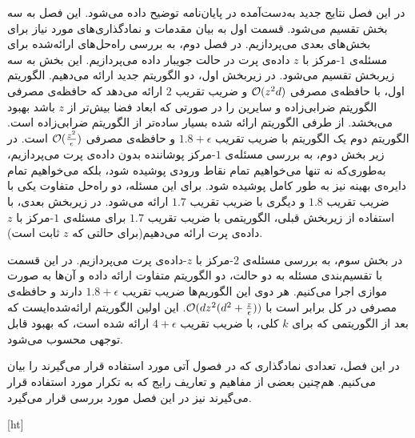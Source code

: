 

در این فصل نتایج جدید به‌دست‌آمده در پایان‌نامه توضیح داده می‌شود. این فصل به سه بخش تقسیم می‌شود. قسمت اول به بیان مقدمات و نمادگذاری‌های مورد نیاز برای بخش‌های بعدی می‌پردازیم. در فصل دوم، به بررسی راه‌حل‌های ارائه‌شده برای مسئله‌ی $1$-مرکز با $z$ داده‌ی پرت در حالت جویبار داده می‌پردازیم. این بخش به سه زیربخش تقسیم می‌شود. در زیربخش اول، دو الگوریتم جدید ارائه می‌دهیم. الگوریتم اول، با حافظه‌ی مصرفی $\mathcal{O}(z^2d)$ و ضریب تقریب $2$ ارائه می‌دهد که حافظه‌ی مصرفی الگوریتم ضرابی‌زاده و سایرین  را در صورتی که ابعاد فضا بیش‌تر از $z$ باشد بهبود می‌بخشد. از طرفی الگوریتم ارائه شده بسیار ساده‌تر از الگوریتم ضرابی‌زاده است. الگوریتم دوم یک الگوریتم با ضریب تقریب $1.8 + \epsilon$ و حافظه‌ی مصرفی $\mathcal{O}(\frac{z^2}{\epsilon})$ است. در زیر بخش دوم، به بررسی مسئله‌ی $1$-مرکز پوشاننده بدون داده‌ی پرت می‌پردازیم، به‌طوری‌که نه تنها می‌خواهیم تمام نقاط ورودی پوشیده شود، بلکه می‌خواهیم تمام دایره‌ی بهینه نیز به طور کامل پوشیده شود. برای این مسئله، دو راه‌حل متفاوت یکی با ضریب تقریب $1.8$ و دیگری با ضریب تقریب $1.7$ ارائه می‌شود. در زیربخش بعدی، با استفاده از زیربخش قبلی، الگوریتمی با ضریب تقریب $1.7$ برای مسئله‌ی $1$-مرکز با $z$ داده‌ی پرت ارائه می‌دهیم(برای حالتی که $z$ ثابت است). 

در بخش سوم، به بررسی مسئله‌ی $2$-مرکز با $z$-داده‌ی پرت می‌پردازیم. در این قسمت با تقسیم‌بندی مسئله به دو حالت، دو الگوریتم متفاوت ارائه داده و آن‌ها به صورت موازی اجرا می‌کنیم. هر دوی این الگوریم‌ها ضریب تقریب $1.8 + \epsilon$ دارند و حافظه‌ی مصرفی در کل برابر است با 
$\mathcal{O}(dz^2 (d^2 + \frac{z}{\epsilon}))$.
این اولین الگوریتم ارائه‌شده‌ایست که بعد از الگوریتمی که برای $k$ کلی، با ضریب تقریب $4+\epsilon$ ارائه شده است، که بهبود قابل توجهی محسوب می‌شود.


در این فصل، تعدادی نمادگذاری که در فصول آتی مورد استفاده قرار می‌گیرند را بیان می‌کنیم. هم‌چنین بعضی از مفاهیم و تعاریف رایج که به تکرار مورد استفاده قرار می‌گیرند نیز در این فصل مورد بررسی قرار می‌گیرد.


[ht]



 
